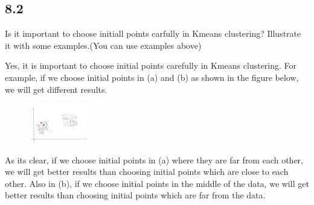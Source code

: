 \documentclass[12pt]{article}
\begin{document}
\subsection{8.2}
Is it important to choose initiall points carfully in Kmeans clustering?
Illustrate it with some examples.(You can use examples above)
\begin{qsolve}[Clustering]
    Yes, it is important to choose initial points carefully in Kmeans clustering.    For example, if we choose initial points in (a) and (b) as shown in the figure below, we will get different results.\\
    \begin{figure}
        \includegraphics[width=0.24\textwidth]{Q8_solution2.png}
        \centering
    \end{figure}
    As its clear, if we choose initial points in (a) where they are far from each other, we will get better results than choosing initial points which are close to each other. Also in (b), if we choose initial points in the middle of the data, we will get better results than choosing initial points which are far from the data.\\
\end{qsolve}
\end{document}
